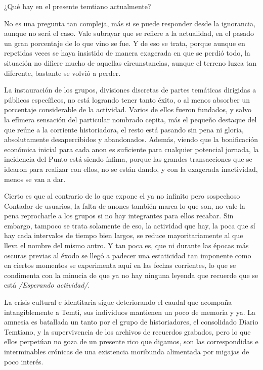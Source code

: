 \documentclass[
]{book}
\begin{document}
¿Qué hay en el presente temtiano actualmente?

No es una pregunta tan compleja, más si se puede responder desde la ignorancia, aunque no será el caso. Vale subrayar que se refiere a la actualidad, en el pasado un gran porcentaje de lo que vino se fue. Y de eso se trata, porque aunque en repetidas veces se haya insistido de manera exagerada en que se perdió todo, la situación no difiere mucho de aquellas circunstancias, aunque el terreno luzca tan diferente, bastante se volvió a perder.

La instauración de los grupos, divisiones discretas de partes temáticas dirigidas a públicos específicos, no está logrando tener tanto éxito, o al menos absorber un porcentaje considerable de la actividad. Varios de ellos fueron fundados, y salvo la efímera sensación del particular nombrado cepita, más el pequeño destaque del que reúne a la corriente historiadora, el resto está pasando sin pena ni gloria, absolutamente desapercibidos y abandonados. Además, viendo que la bonificación económica inicial para cada anon es suficiente para cualquier potencial jornada, la incidencia del Punto está siendo ínfima, porque las grandes transacciones que se idearon para realizar con ellos, no se están dando, y con la exagerada inactividad, menos se van a dar.

Cierto es que al contrario de lo que expone el ya no infinito pero sospechoso Contador de usuarios, la falta de anones también marca lo que son, no vale la pena reprocharle a los grupos si no hay integrantes para ellos recabar. Sin embargo, tampoco se trata solamente de eso, la actividad que hay, la poca que sí hay cada intervalos de tiempo bien largos, se reduce mayoritariamente al que lleva el nombre del mismo antro. Y tan poca es, que ni durante las épocas más oscuras previas al éxodo se llegó a padecer una estaticidad tan imponente como en ciertos momentos se experimenta aquí en las fechas corrientes, lo que se condimenta con la minucia de que ya no hay ninguna leyenda que recuerde que se está \emph{/Esperando actividad/}.

La crisis cultural e identitaria sigue deteriorando el caudal que acompaña intangiblemente a Temti, sus individuos mantienen un poco de memoria y ya. La amnesia es batallada un tanto por el grupo de historiadores, el consolidado Diario Temtiano, y la supervivencia de los archivos de recuerdos grabados, pero lo que ellos perpetúan no goza de un presente rico que digamos, son las correspondidas e interminables crónicas de una existencia moribunda alimentada por migajas de poco interés.
\end{document}
